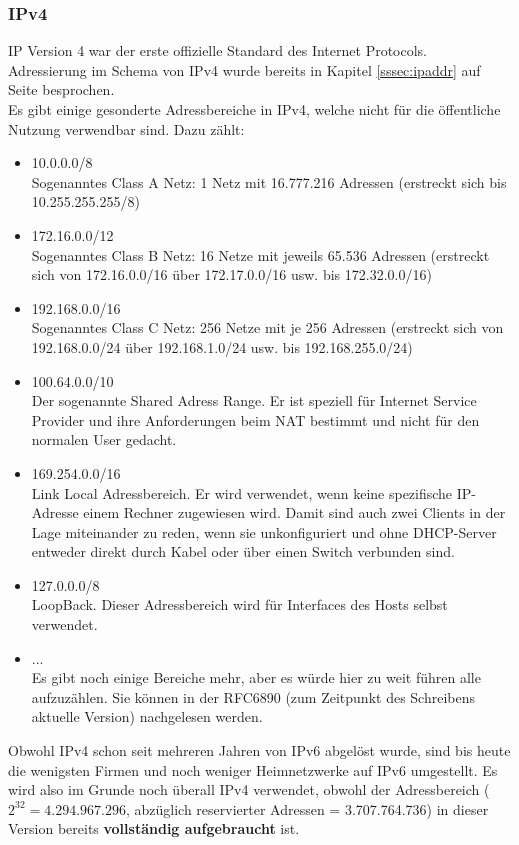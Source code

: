 \documentclass[12pt,a4paper]{report}
\begin{document}
\begin{onehalfspace}
\subsubsection{IPv4}
IP Version 4 war der erste offizielle Standard des Internet Protocols.\\
Adressierung im Schema von IPv4 wurde bereits in Kapitel \ref{sssec:ipaddr} auf Seite \pageref{sssec:ipaddr} besprochen.\\

Es gibt einige gesonderte Adressbereiche in IPv4, welche nicht für die öffentliche Nutzung verwendbar sind. Dazu zählt:
\begin{itemize}
\item 10.0.0.0/8\\
Sogenanntes Class A Netz: 1 Netz mit 16.777.216 Adressen (erstreckt sich bis 10.255.255.255/8)
\item 172.16.0.0/12\\
Sogenanntes Class B Netz: 16 Netze mit jeweils 65.536 Adressen (erstreckt sich von 172.16.0.0/16 über 172.17.0.0/16 usw. bis 172.32.0.0/16)
\item 192.168.0.0/16\\
Sogenanntes Class C Netz: 256 Netze mit je 256 Adressen (erstreckt sich von 192.168.0.0/24 über 192.168.1.0/24 usw. bis 192.168.255.0/24)
\item 100.64.0.0/10\\
Der sogenannte Shared Adress Range. Er ist speziell für Internet Service Provider und ihre Anforderungen beim NAT bestimmt und nicht für den normalen User gedacht.
\item 169.254.0.0/16\\
Link Local Adressbereich. Er wird verwendet, wenn keine spezifische IP-Adresse einem Rechner zugewiesen wird. Damit sind auch zwei Clients in der Lage miteinander zu reden, wenn sie unkonfiguriert und ohne DHCP-Server entweder direkt durch Kabel oder über einen Switch verbunden sind.
\item 127.0.0.0/8\\
LoopBack. Dieser Adressbereich wird für Interfaces des Hosts selbst verwendet. 
\item ...\\
Es gibt noch einige Bereiche mehr, aber es würde hier zu weit führen alle aufzuzählen. Sie können in der RFC6890 (zum Zeitpunkt des Schreibens aktuelle Version) nachgelesen werden.
\end{itemize}

Obwohl IPv4 schon seit mehreren Jahren von IPv6 abgelöst wurde, sind bis heute die wenigsten Firmen und noch weniger Heimnetzwerke auf IPv6 umgestellt. Es wird also im Grunde noch überall IPv4 verwendet, obwohl der Adressbereich ($2^{32} = 4.294.967.296$, abzüglich reservierter Adressen = 3.707.764.736) in dieser Version bereits \textbf{vollständig aufgebraucht} ist.\\


\end{onehalfspace}
\end{document}

